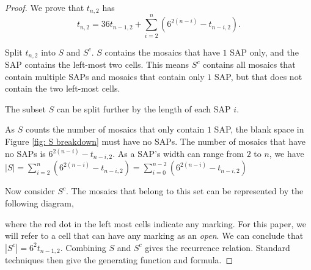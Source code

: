 \documentclass[12pt]{article}
\theoremstyle{plain}
\theoremstyle{definition}
\theoremstyle{remark}
\theoremstyle{definition}
\newcommand{\cellopen}[4]{ \draw[thick] ( #1 , #2 ) rectangle ( #3 , #4 ); \node[shape=circle,draw=red,fill=red, inner sep=0pt,minimum size=3pt] (A) at ( #1 * 0.5 + #3 * 0.5 , #2 * 0.5 + #4 * 0.5 ){};}
\newcommand{\cellA}[4]{ \draw[thick] ( #1 , #2 ) rectangle ( #3 , #4 ); \draw[red, thick] (#3 * 0.5 + #1 * 0.5 , #2) -- (#3, #4 * 0.5 + #2 * 0.5);}
\newcommand{\cellB}[4]{ \draw[thick] ( #1 , #2 ) rectangle ( #3 , #4 ); \draw[red, thick] (#3 * 0.5 + #1 * 0.5 , #2) -- (#1, #4 * 0.5 + #2 * 0.5);}
\newcommand{\cellC}[4]{ \draw[thick] ( #1 , #2 ) rectangle ( #3 , #4 ); \draw[red, thick] (#3 * 0.5 + #1 * 0.5 , #4) -- (#1, #4 * 0.5 + #2 * 0.5);}
\newcommand{\cellD}[4]{ \draw[thick] ( #1 , #2 ) rectangle ( #3 , #4 ); \draw[red, thick] (#3 * 0.5 + #1 * 0.5 , #4) -- (#3, #4 * 0.5 + #2 * 0.5);}
\newcommand{\cellF}[4]{ \draw[thick] ( #1 , #2 ) rectangle ( #3 , #4 ); \draw[red, thick] (#3, #4 * 0.5 + #2 * 0.5) -- (#1, #4 * 0.5 + #2 * 0.5);}
\begin{document}
\begin{proof}
We prove that $t_{n,2}$ has
$$t_{n,2} = 36t_{n-1,2} + \sum_{i=2}^{n}(6^{2(n-i)}-t_{n-i,2}).$$

Split $t_{n,2}$ into $S$ and $S^c$. $S$ contains the mosaics that have $1$ SAP only, and the SAP contains the left-most two cells. This means $S^c$ contains all mosaics that contain multiple SAPs and mosaics that contain only $1$ SAP, but that does not contain the two left-most cells.

The subset $S$ can be split further by the length of each SAP $i$. 

\begin{center}
\label{fig: S breakdown}
\end{center}

As $S$ counts the number of mosaics that only contain $1$ SAP, the blank space in Figure \ref{fig: S breakdown} must have no SAPs. The number of mosaics that have no SAPs is $6^{2(n-i)}-t_{n-i,2}$. As a SAP's width can range from $2$ to $n$, we have $|S| = \sum_{i=2}^{n}(6^{2(n-i)}-t_{n-i,2}) = \sum_{i=0}^{n-2}(6^{2(n-i)}-t_{n-i,2})$

Now consider $S^c$. The mosaics that belong to this set can be represented by the following diagram,

\begin{center}
\label{fig: Sc breakdown}
\end{center}

where the red dot in the left most cells indicate any marking. For this paper, we will refer to a cell that can have any marking as an \textit{open}. We can conclude that $|S^c| = 6^{2}t_{n-1,2}$. Combining $S$ and $S^c$ gives the recurrence relation. Standard techniques then give the generating function and formula.
\end{proof}
\end{document}
